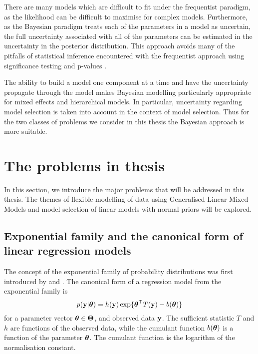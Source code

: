 There are many models which are difficult to fit under the frequentist paradigm,
as the likelihood can be difficult to maximise for complex models. Furthermore,
as the Bayesian paradigm treats each of the parameters in a model as uncertain,
the full uncertainty associated with all of the parameters can be estimated in
the uncertainty in the posterior distribution. This approach avoids many of the
pitfalls of statistical inference encountered with the frequentist approach
using significance testing and p-values \citep{Cox2005}.

The ability to build a model one component at a time and have the uncertainty
propagate through the model makes Bayesian modelling  particularly appropriate
for mixed effects and hierarchical models. In particular, uncertainty regarding
model selection is taken into account in the context of model selection. Thus
for the two classes of problems we consider in this thesis the Bayesian approach
is more suitable.

\section{The problems in thesis}

In this section, we introduce the major problems that will be addressed in this
thesis. The themes of flexible modelling of data using Generalised Linear Mixed
Models and model selection of linear models with normal priors  will be
explored.

\subsection{Exponential family and the canonical form of linear regression
models}

The concept of the exponential family of probability distributions was first
introduced by \cite{Koopman1935} and \cite{pitman_1936}. The canonical form of a
regression model from the exponential family is
\begin{equation}\label{eq:exponential_family}
	p({\bf y} | {\boldsymbol \theta}) = h({\bf y}) \exp \{ {\boldsymbol \theta}^\top T({\bf y}) - b({\boldsymbol \theta}) \}
\end{equation}
for a parameter vector ${\boldsymbol \theta} \in \mathbf{\Theta}$, and observed data ${\bf y}$.
The sufficient statistic $T$ and $h$ are functions of the observed data, while
the cumulant function $b({\boldsymbol \theta})$ is a function of the parameter ${\boldsymbol \theta}$. The
cumulant function is the logarithm of the normalisation constant.

